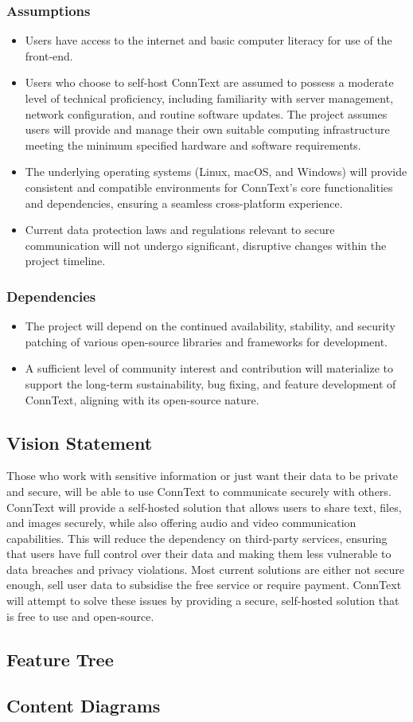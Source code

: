 \documentclass{article}
\begin{document}
\subsubsection{Assumptions}
\begin{itemize}
    \item Users have access to the internet and basic computer literacy for use of the front-end.
    \item Users who choose to self-host ConnText are assumed to possess a moderate level of technical proficiency, including familiarity with server management, network configuration, and routine software updates. The project assumes users will provide and manage their own suitable computing infrastructure meeting the minimum specified hardware and software requirements.
    \item The underlying operating systems (Linux, macOS, and Windows) will provide consistent and compatible environments for ConnText's core functionalities and dependencies, ensuring a seamless cross-platform experience.
    \item Current data protection laws and regulations relevant to secure communication will not undergo significant, disruptive changes within the project timeline.
\end{itemize}

\subsubsection{Dependencies}
\begin{itemize}
    \item The project will depend on the continued availability, stability, and security patching of various open-source libraries and frameworks for development.
    \item A sufficient level of community interest and contribution will materialize to support the long-term sustainability, bug fixing, and feature development of ConnText, aligning with its open-source nature.
\end{itemize}

\subsection{Vision Statement}
Those who work with sensitive information or just want their data to be private and secure, will be able to use ConnText to communicate securely with others. ConnText will provide a self-hosted solution that allows users to share text, files, and images securely, while also offering audio and video communication capabilities. This will reduce the dependency on third-party services, ensuring that users have full control over their data and making them less vulnerable to data breaches and privacy violations. Most current solutions are either not secure enough, sell user data to subsidise the free service or require payment. ConnText will attempt to solve these issues by providing a secure, self-hosted solution that is free to use and open-source.

\subsection{Feature Tree}

\subsection{Content Diagrams}
\end{document}
